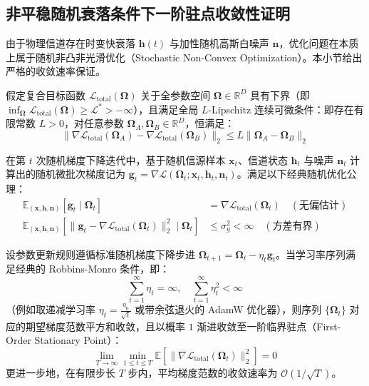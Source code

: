 \subsection{非平稳随机衰落条件下一阶驻点收敛性证明}
由于物理信道存在时变快衰落 $\bm{h}(t)$ 与加性随机高斯白噪声 $\bm{n}$，优化问题在本质上属于随机非凸非光滑优化（Stochastic Non-Convex Optimization）。本小节给出严格的收敛速率保证。

\begin{definition}
假定复合目标函数 $\mathcal{L}_{\text{total}}(\bm{\Omega})$ 关于全参数空间 $\bm{\Omega} \in \mathbb{R}^D$ 具有下界（即 $\inf_{\bm{\Omega}} \mathcal{L}_{\text{total}}(\bm{\Omega}) \ge \mathcal{L}^* > -\infty$），且满足全局 $L$-Lipschitz 连续可微条件：即存在有限常数 $L > 0$，对任意参数 $\bm{\Omega}_A, \bm{\Omega}_B \in \mathbb{R}^D$，恒满足：
\begin{equation}
  \| \nabla \mathcal{L}_{\text{total}}(\bm{\Omega}_A) - \nabla \mathcal{L}_{\text{total}}(\bm{\Omega}_B) \|_2 \le L \| \bm{\Omega}_A - \bm{\Omega}_B \|_2
  \label{eq:lipschitz_condition}
\end{equation}
\end{definition}

\begin{definition}[随机信道梯度无偏性与方差有界假设]
在第 $t$ 次随机梯度下降迭代中，基于随机信源样本 $\bm{x}_t$、信道状态 $\bm{h}_t$ 与噪声 $\bm{n}_t$ 计算出的随机微批次梯度记为 $\bm{g}_t = \nabla \mathcal{L}(\bm{\Omega}_t; \bm{x}_t, \bm{h}_t, \bm{n}_t)$。满足以下经典随机优化公理：
\begin{align}
  \mathbb{E}_{(\bm{x}, \bm{h}, \bm{n})} [\bm{g}_t \mid \bm{\Omega}_t] &= \nabla \mathcal{L}_{\text{total}}(\bm{\Omega}_t) \quad (\text{无偏估计}) \label{eq:unbiased_grad} \\
  \mathbb{E}_{(\bm{x}, \bm{h}, \bm{n})} [\|\bm{g}_t - \nabla \mathcal{L}_{\text{total}}(\bm{\Omega}_t)\|_2^2 \mid \bm{\Omega}_t] &\le \sigma_g^2 < \infty \quad (\text{方差有界}) \label{eq:bounded_variance}
\end{align}
\end{definition}

\begin{theorem}[随机梯度下降一阶驻点渐进收敛性]
\label{thm:convergence}
设参数更新规则遵循标准随机梯度下降步进 $\bm{\Omega}_{t+1} = \bm{\Omega}_t - \eta_t \bm{g}_t$。当学习率序列满足经典的 Robbins-Monro 条件，即：
\begin{equation}
  \sum_{t=1}^\infty \eta_t = \infty, \quad \sum_{t=1}^\infty \eta_t^2 < \infty
  \label{eq:robbins_monro}
\end{equation}
（例如取递减学习率 $\eta_t = \frac{\eta_0}{\sqrt{t}}$ 或带余弦退火的 AdamW 优化器），则序列 $\{\bm{\Omega}_t\}$ 对应的期望梯度范数平方和收敛，且以概率 $1$ 渐进收敛至一阶临界驻点（First-Order Stationary Point）：
\begin{equation}
  \lim_{T \to \infty} \min_{1 \le t \le T} \mathbb{E} \left[ \|\nabla \mathcal{L}_{\text{total}}(\bm{\Omega}_t)\|_2^2 \right] = 0
  \label{eq:stationary_convergence_limit}
\end{equation}
更进一步地，在有限步长 $T$ 步内，平均梯度范数的收敛速率为 $\mathcal{O}(1/\sqrt{T})$。
\end{theorem}

